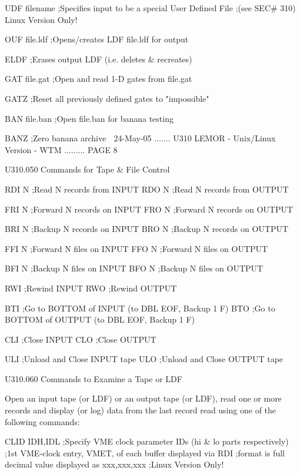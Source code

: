    UDF  filename ;Specifies input to be a special User Defined File
                 ;(see SEC# 310) Linux Version Only!
 
   OUF  file.ldf ;Opens/creates LDF file.ldf for output
 
   ELDF          ;Erases output LDF (i.e. deletes & recreates)
 
   GAT  file.gat ;Open and read 1-D gates from file.gat
 
   GATZ          ;Reset all previously defined gates to "impossible"
 
   BAN  file.ban ;Open file.ban for banana testing
 
   BANZ          ;Zero banana archive
    
   24-May-05 ....... U310  LEMOR - Unix/Linux Version - WTM ......... PAGE   8
 
   U310.050  Commands for Tape & File Control
 
   RDI  N        ;Read    N records from INPUT
   RDO  N        ;Read    N records from OUTPUT
 
   FRI  N        ;Forward N records on   INPUT
   FRO  N        ;Forward N records on   OUTPUT
 
   BRI  N        ;Backup  N records on   INPUT
   BRO  N        ;Backup  N records on   OUTPUT
 
   FFI  N        ;Forward N files   on   INPUT
   FFO  N        ;Forward N files   on   OUTPUT
 
   BFI  N        ;Backup  N files   on   INPUT
   BFO  N        ;Backup  N files   on   OUTPUT
 
   RWI           ;Rewind                 INPUT
   RWO           ;Rewind                 OUTPUT
 
   BTI           ;Go to BOTTOM of INPUT  (to DBL EOF, Backup 1 F)
   BTO           ;Go to BOTTOM of OUTPUT (to DBL EOF, Backup 1 F)
 
   CLI           ;Close                  INPUT
   CLO           ;Close                  OUTPUT
 
   ULI           ;Unload and Close       INPUT  tape
   ULO           ;Unload and Close       OUTPUT tape
 
   U310.060  Commands to  Examine a Tape or LDF
 
   Open an input tape (or LDF) or an output tape (or LDF), read  one  or  more
   records  and  display  (or log) data from the last record read using one of
   the following commands:
 
   CLID IDH,IDL  ;Specify VME clock parameter IDs (hi & lo parts respectively)
                 ;1st VME-clock entry, VMET, of each buffer displayed via RDI
                 ;format is full decimal value displayed as xxx,xxx,xxx
                 ;Linux Version Only!
 
